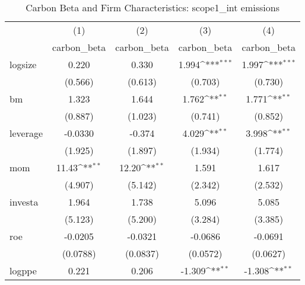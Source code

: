 \begin{table}[htbp]\centering
\def\sym#1{\ifmmode^{#1}\else\(^{#1}\)\fi}
\caption{Carbon Beta and Firm Characteristics: scope1\_int emissions}
\begin{tabular}{l*{4}{c}}
\hline\hline
                    &\multicolumn{1}{c}{(1)}&\multicolumn{1}{c}{(2)}&\multicolumn{1}{c}{(3)}&\multicolumn{1}{c}{(4)}\\
                    &\multicolumn{1}{c}{carbon\_beta}&\multicolumn{1}{c}{carbon\_beta}&\multicolumn{1}{c}{carbon\_beta}&\multicolumn{1}{c}{carbon\_beta}\\
\hline
logsize             &       0.220         &       0.330         &       1.994\sym{***}&       1.997\sym{***}\\
                    &     (0.566)         &     (0.613)         &     (0.703)         &     (0.730)         \\
[1em]
bm                  &       1.323         &       1.644         &       1.762\sym{**} &       1.771\sym{**} \\
                    &     (0.887)         &     (1.023)         &     (0.741)         &     (0.852)         \\
[1em]
leverage            &     -0.0330         &      -0.374         &       4.029\sym{**} &       3.998\sym{**} \\
                    &     (1.925)         &     (1.897)         &     (1.934)         &     (1.774)         \\
[1em]
mom                 &       11.43\sym{**} &       12.20\sym{**} &       1.591         &       1.617         \\
                    &     (4.907)         &     (5.142)         &     (2.342)         &     (2.532)         \\
[1em]
investa             &       1.964         &       1.738         &       5.096         &       5.085         \\
                    &     (5.123)         &     (5.200)         &     (3.284)         &     (3.385)         \\
[1em]
roe                 &     -0.0205         &     -0.0321         &     -0.0686         &     -0.0691         \\
                    &    (0.0788)         &    (0.0837)         &    (0.0572)         &    (0.0627)         \\
[1em]
logppe              &       0.221         &       0.206         &      -1.309\sym{**} &      -1.308\sym{**} \\

\end{tabular}
\end{table}
